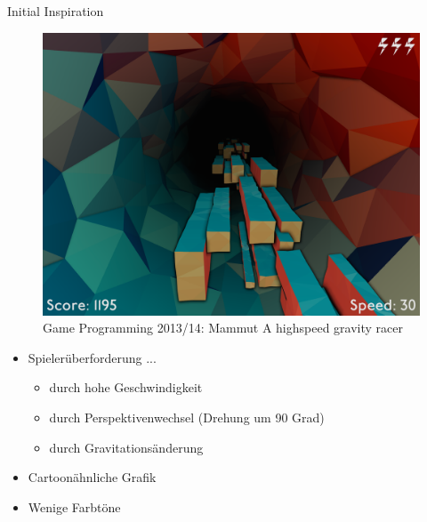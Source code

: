 

\subtitle{Konzeptpräsentation}



\slidetitle


\slideonetoone
{Initial Inspiration}
{
	\begin{figure}
		\centering
		\includegraphics[width=\textwidth, height=0.7\textheight, keepaspectratio]{images/mammut_cave}
		\caption{Game Programming 2013/14: 
Mammut \linebreak A highspeed gravity racer}
	\end{figure}
}
{
	\begin{itemize}
		\item Spielerüberforderung ...
		 \begin{itemize}
		 	\item durch hohe Geschwindigkeit
		 	\item durch Perspektivenwechsel (Drehung um 90 Grad)
		 	\item durch Gravitationsänderung
		 \end{itemize}
		 \item Cartoonähnliche Grafik 
		 \item Wenige Farbtöne
	\end{itemize}
}

